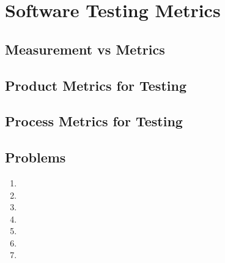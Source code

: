 \setchapterpreamble[u]{\margintoc}
\chapter{Software Testing Metrics}
\section{Measurement vs Metrics}
\section{Product Metrics for Testing}
\section{Process Metrics for Testing}
\section{Problems}
\begin{enumerate}
    \item 
    \item 
    \item 
    \item 
    \item 
    \item
    \item 
\end{enumerate}